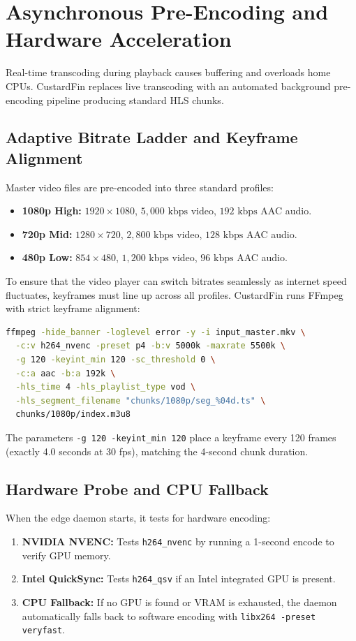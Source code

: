 \section{Asynchronous Pre-Encoding and Hardware Acceleration}
\label{sec:feat_transcoding}

Real-time transcoding during playback causes buffering and overloads home CPUs. CustardFin replaces live transcoding with an automated background pre-encoding pipeline producing standard HLS chunks.

\subsection{Adaptive Bitrate Ladder and Keyframe Alignment}
Master video files are pre-encoded into three standard profiles:
\begin{itemize}
    \item \textbf{1080p High:} $1920 \times 1080$, $5{,}000\text{ kbps}$ video, $192\text{ kbps}$ AAC audio.
    \item \textbf{720p Mid:} $1280 \times 720$, $2{,}800\text{ kbps}$ video, $128\text{ kbps}$ AAC audio.
    \item \textbf{480p Low:} $854 \times 480$, $1{,}200\text{ kbps}$ video, $96\text{ kbps}$ AAC audio.
\end{itemize}

To ensure that the video player can switch bitrates seamlessly as internet speed fluctuates, keyframes must line up across all profiles. CustardFin runs FFmpeg with strict keyframe alignment:
\begin{lstlisting}[language=bash,caption={FFmpeg Transcoding Command}]
ffmpeg -hide_banner -loglevel error -y -i input_master.mkv \
  -c:v h264_nvenc -preset p4 -b:v 5000k -maxrate 5500k \
  -g 120 -keyint_min 120 -sc_threshold 0 \
  -c:a aac -b:a 192k \
  -hls_time 4 -hls_playlist_type vod \
  -hls_segment_filename "chunks/1080p/seg_%04d.ts" \
  chunks/1080p/index.m3u8
\end{lstlisting}
The parameters \texttt{-g 120 -keyint\_min 120} place a keyframe every 120 frames (exactly 4.0 seconds at 30 fps), matching the 4-second chunk duration.

\subsection{Hardware Probe and CPU Fallback}
When the edge daemon starts, it tests for hardware encoding:
\begin{enumerate}
    \item \textbf{NVIDIA NVENC:} Tests \texttt{h264\_nvenc} by running a 1-second encode to verify GPU memory.
    \item \textbf{Intel QuickSync:} Tests \texttt{h264\_qsv} if an Intel integrated GPU is present.
    \item \textbf{CPU Fallback:} If no GPU is found or VRAM is exhausted, the daemon automatically falls back to software encoding with \texttt{libx264 -preset veryfast}.
\end{enumerate}

